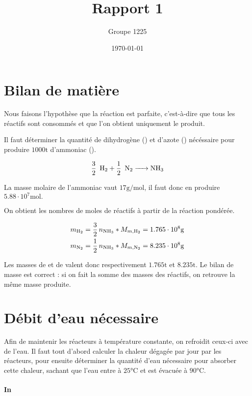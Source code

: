 \documentclass[a4paper, oneside, 12pt]{article}
\title{Rapport 1}
\author{Groupe 1225}
\date{\today}
\begin{document}
\maketitle

\section{Bilan de matière}

Nous faisons l'hypothèse que la réaction est parfaite, 
c'est-à-dire que tous les réactifs sont consommés 
et que l'on obtient uniquement le produit.

Il faut déterminer la quantité de dihydrogène () et d'azote () 
nécéssaire pour produire $1000 \si{\tonne}$ d'ammoniac ().

\begin{equation}
	\ce{\frac{3}{2} \, H2 + \frac{1}{2} \, N2 -> NH3} 
	\label{eq:ammoniac}
\end{equation}

La masse molaire de l'ammoniac vaut $17 \si{\gram\per\mole}$,
il faut donc en produire $5.88 \cdot 10^7 \si{\mole}.$

On obtient les nombres de moles de réactifs à partir de la réaction pondérée. 

\begin{align*}
	m_{\ce{H2}}  = \frac{3}{2} \, n_{\ce{NH3}} * M_{m, \ce{H2}} 
	= 1.765 \cdot 10^8  \si{\gram} \\
	m_{\ce{N2}} = \frac{1}{2} \, n_{\ce{NH3}} * M_{m, \ce{N2}} 
	= 8.235 \cdot 10^8 \si{\gram}
\end{align*}

Les masses de  et de  valent donc 
respectivement $1.765 \si{\tonne}$ et $8.235 \si{\tonne}$.
Le bilan de masse est correct : si on fait la somme des masses des réactifs,
on retrouve la même masse produite.


\section{Débit d'eau nécessaire}

Afin de maintenir les réacteurs à température constante, 
on refroidit ceux-ci avec de l'eau.
Il faut tout d'abord calculer la chaleur dégagée par jour par les réacteurs,
pour ensuite déterminer la quantité d'eau nécessaire pour absorber cette chaleur,
sachant que l'eau entre à $25 \si{\degreeCelsius}$ et 
est évacuée à $90 \si{\degreeCelsius}$. 

\paragraph{In}
\end{document}
